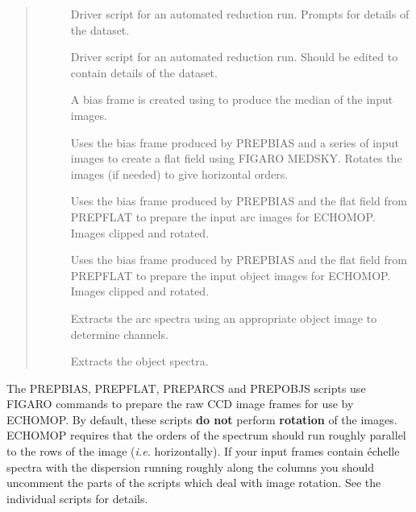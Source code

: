 \documentclass[twoside,11pt]{starlink}
\begin{document}
\begin{quote}
\begin{description}

\item []
      Driver script for an automated reduction run.
      Prompts for details of the dataset.

\item []
      Driver script for an automated reduction run.
      Should be edited to contain details of the dataset.

\item []
      A bias frame is created using 
       to produce the median of the input
      images.

\item []
      Uses the bias frame produced by PREPBIAS and a series
      of input images to create a flat field using FIGARO MEDSKY.
      Rotates the images (if needed) to give horizontal orders.

\item []
      Uses the bias frame produced by PREPBIAS and the flat field
      from PREPFLAT to prepare the input arc images for ECHOMOP\@.
      Images clipped and rotated.

\item []
      Uses the bias frame produced by PREPBIAS and the flat field
      from PREPFLAT to prepare the input object images for ECHOMOP\@.
      Images clipped and rotated.

\item []
      Extracts the arc spectra using an appropriate object
      image to determine channels.

\item []
      Extracts the object spectra.

\end{description}
\end{quote}

The PREPBIAS, PREPFLAT, PREPARCS and PREPOBJS scripts use FIGARO commands to
prepare the raw CCD image frames for use by ECHOMOP\@.
By default, these scripts \textbf{do not} perform \textbf{rotation} of the images.
ECHOMOP requires that the orders of the spectrum should run roughly parallel
to the rows of the image ({\it{i.e.}} horizontally).
If your input frames contain \'{e}chelle spectra with the dispersion running
roughly along the columns you should uncomment the parts of the scripts which
deal with image rotation.
See the individual scripts for details.
\end{document}

